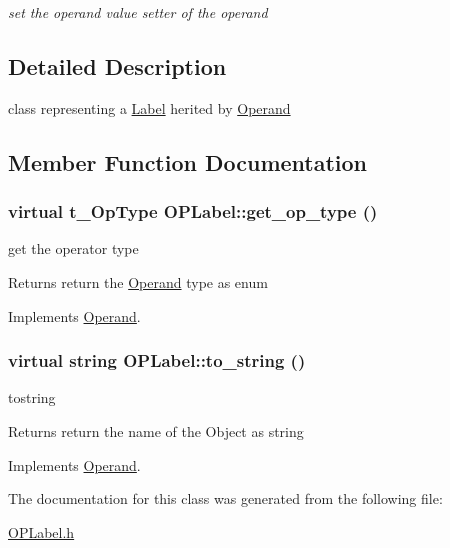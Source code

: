 \begin{DoxyCompactItemize}
\begin{DoxyCompactList}\small\item\em set the operand value setter of the operand \item\end{DoxyCompactList}\end{DoxyCompactItemize}


\subsection{Detailed Description}
class representing a \hyperlink{classLabel}{Label} herited by \hyperlink{classOperand}{Operand} 

\subsection{Member Function Documentation}
\hypertarget{classOPLabel_a1a6ec701c549a6475d44ffcced1c23b5}{
\subsubsection[{get\_\-op\_\-type}]{\setlength{\rightskip}{0pt plus 5cm}virtual t\_\-OpType OPLabel::get\_\-op\_\-type ()}}
\label{classOPLabel_a1a6ec701c549a6475d44ffcced1c23b5}


get the operator type \begin{DoxyReturn}{Returns}
return the \hyperlink{classOperand}{Operand} type as enum 
\end{DoxyReturn}


Implements \hyperlink{classOperand_afd469e305a467e2574f34ac9bd6c62b0}{Operand}.\hypertarget{classOPLabel_a51c4e8f45422f03edcb71d472cf5e973}{
\subsubsection[{to\_\-string}]{\setlength{\rightskip}{0pt plus 5cm}virtual string OPLabel::to\_\-string ()}}
\label{classOPLabel_a51c4e8f45422f03edcb71d472cf5e973}


tostring \begin{DoxyReturn}{Returns}
return the name of the Object as string 
\end{DoxyReturn}


Implements \hyperlink{classOperand_a28aed96d5fafee66be81c30c1435ad00}{Operand}.

The documentation for this class was generated from the following file:\begin{DoxyCompactItemize}
\item 
\hyperlink{OPLabel_8h}{OPLabel.h}\end{DoxyCompactItemize}
